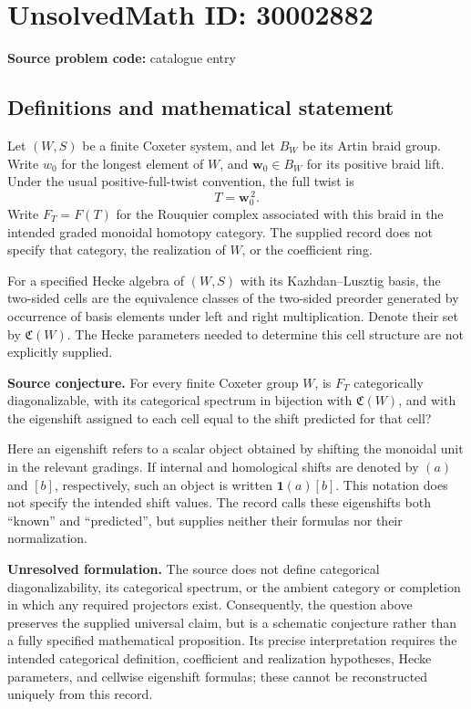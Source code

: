 \documentclass[11pt]{article}
\begin{document}
\section*{UnsolvedMath ID: 30002882}
\textbf{Source problem code:} catalogue entry
\subsection{Definitions and mathematical statement}
Let \((W,S)\) be a finite Coxeter system, and let \(B_W\) be its Artin braid group. Write \(w_0\) for the longest element of \(W\), and \(\boldsymbol{w}_0\in B_W\) for its positive braid lift. Under the usual positive-full-twist convention, the full twist is
\[
T=\boldsymbol{w}_0^{\,2}.
\]
Write \(F_T=F(T)\) for the Rouquier complex associated with this braid in the intended graded monoidal homotopy category. The supplied record does not specify that category, the realization of \(W\), or the coefficient ring.

For a specified Hecke algebra of \((W,S)\) with its Kazhdan--Lusztig basis, the two-sided cells are the equivalence classes of the two-sided preorder generated by occurrence of basis elements under left and right multiplication. Denote their set by \(\mathfrak C(W)\). The Hecke parameters needed to determine this cell structure are not explicitly supplied.

\textbf{Source conjecture.} For every finite Coxeter group \(W\), is \(F_T\) categorically diagonalizable, with its categorical spectrum in bijection with \(\mathfrak C(W)\), and with the eigenshift assigned to each cell equal to the shift predicted for that cell?

Here an eigenshift refers to a scalar object obtained by shifting the monoidal unit in the relevant gradings. If internal and homological shifts are denoted by \((a)\) and \([b]\), respectively, such an object is written \(\mathbf 1(a)[b]\). This notation does not specify the intended shift values. The record calls these eigenshifts both ``known'' and ``predicted'', but supplies neither their formulas nor their normalization.

\textbf{Unresolved formulation.} The source does not define categorical diagonalizability, its categorical spectrum, or the ambient category or completion in which any required projectors exist. Consequently, the question above preserves the supplied universal claim, but is a schematic conjecture rather than a fully specified mathematical proposition. Its precise interpretation requires the intended categorical definition, coefficient and realization hypotheses, Hecke parameters, and cellwise eigenshift formulas; these cannot be reconstructed uniquely from this record.
\end{document}
